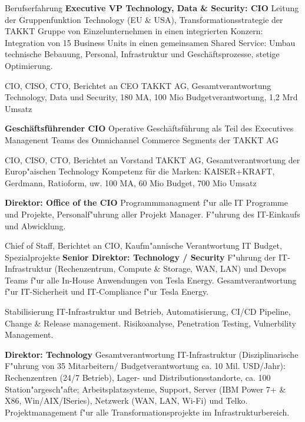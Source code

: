 \begin{rubric}{Berufserfahrung}
\entry*[01/2022 - heute] \textbf{Executive VP Technology, Data \& Security: CIO}\newline
{} 
Leitung der Gruppenfunktion Technology (EU \& USA), Transformationsstrategie der TAKKT Gruppe von Einzelunternehmen in einen integrierten Konzern: Integration von 15 Business Units in einen gemeinsamen Shared Service: Umbau technische Bebauung, Personal, Infrastruktur und Geschäftsprozesse, stetige Optimierung.

CIO, CISO, CTO, Berichtet an CEO TAKKT AG, Gesamtverantwortung Technology, Data und Security, 180 MA, 100 Mio Budgetverantwortung, 1,2 Mrd Umsatz

\entry*[04/2018 - 01/2022] \textbf{Geschäftsführender CIO}\newline
{} 
Operative Geschäftsführung als Teil des Executives Managenent Teams des Omnichannel Commerce Segments der TAKKT AG

CIO, CISO, CTO, Berichtet an Vorstand TAKKT AG, Gesamtverantwortung der Europ"aischen Technology Kompetenz für die Marken: KAISER+KRAFT, Gerdmann, Ratioform, uw. 100 MA, 60 Mio Budget, 700 Mio Umsatz\newline

\entry*[12/2016 - 04/2018] \textbf{Direktor: Office of the CIO}\newline
{} 
Programmmanagment f"ur alle IT Programme und Projekte, Personalf"uhrung aller Projekt Manager. F"uhrung des IT-Einkaufs und Abwicklung. 

Chief of Staff, Berichtet an CIO, Kaufm"annische Verantwortung IT Budget, Spezialprojekte 
\pagebreak
{}
\entry*[08/2015 - 12/2016] \textbf{Senior Direktor: Technology / Security}\newline
{} 
F"uhrung der IT-Infrastruktur (Rechenzentrum, Compute \& Storage, WAN, LAN) und Devops Teams f"ur alle In-House Anwendungen von Tesla Energy. Gesamtverantwortung f"ur IT-Sicherheit und IT-Compliance f"ur Tesla Energy.

Stabilisierung IT-Infrastruktur und Betrieb, Automatisierung, CI/CD Pipeline, Change \& Release management. Risikoanalyse, Penetration Testing, Vulnerbility Management.\newline

\entry*[04/2013 - 08/2015] \textbf{Direktor: Technology}\newline
{} 
Gesamtverantwortung IT-Infrastruktur (Disziplinarische F"uhrung von 35 Mitarbeitern/ Budgetverantwortung ca. 10 Mil. USD/Jahr): Rechenzentren (24/7 Betrieb), Lager- und Distributionsstandorte, ca. 100 Station"argesch"afte; Arbeitsplatzsysteme, Support, Server (IBM Power 7+ \& X86, Win/AIX/ISeries), Netzwerk (WAN, LAN, Wi-Fi) und Telko. Projektmanagement f"ur alle Transformationsprojekte im Infrastrukturbereich.


\end{rubric}
